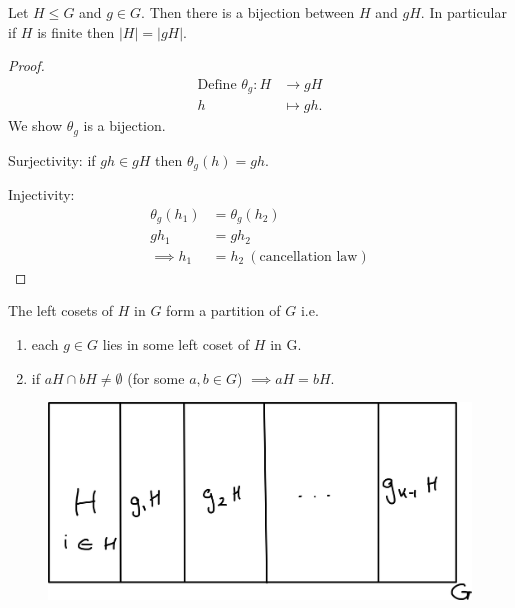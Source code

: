\begin{lemma}
\protect\hypertarget{lem:nine}{}\label{lem:nine}Let \(H \leq G\) and \(g \in G\).
Then there is a bijection between \(H\) and \(gH\).
In particular if \(H\) is finite then \(|H| = |gH|\).
\end{lemma}

\begin{proof}
\begin{align*}
    \text{Define } \theta_g : H &\to gH \\
    h &\mapsto gh.
\end{align*}
We show \(\theta_g\) is a bijection.

Surjectivity: if \(gh \in gH\) then \(\theta_g(h) = gh\).

Injectivity: \begin{align*}
    \theta_g(h_1) &= \theta_g(h_2) \\
    g h_1 &= g h_2 \\
    \implies h_1 &= h_2 \ (\text{cancellation law})
\end{align*}
\end{proof}

\begin{lemma}
\protect\hypertarget{lem:ten}{}\label{lem:ten}

    The left cosets of \(H\) in \(G\) form a partition of \(G\) i.e.

    \begin{enumerate}
    \def\labelenumi{\roman{enumi}.}
    \item
    each \(g \in G\) lies in some left coset of \(H\) in G.
    \item
    if \(aH \cap bH \neq \emptyset\) (for some \(a, b \in G\)) \(\implies aH = bH\).
    \end{enumerate}

    \begin{figure}
        {\centering \includegraphics{figures/03-cosets} }
    \end{figure}
\end{lemma}

